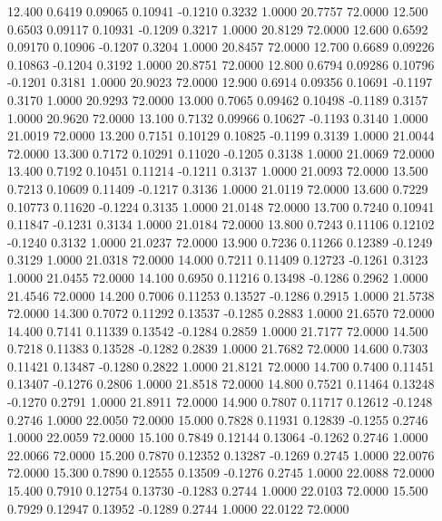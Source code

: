   12.400   0.6419   0.09065   0.10941  -0.1210   0.3232   1.0000  20.7757  72.0000
  12.500   0.6503   0.09117   0.10931  -0.1209   0.3217   1.0000  20.8129  72.0000
  12.600   0.6592   0.09170   0.10906  -0.1207   0.3204   1.0000  20.8457  72.0000
  12.700   0.6689   0.09226   0.10863  -0.1204   0.3192   1.0000  20.8751  72.0000
  12.800   0.6794   0.09286   0.10796  -0.1201   0.3181   1.0000  20.9023  72.0000
  12.900   0.6914   0.09356   0.10691  -0.1197   0.3170   1.0000  20.9293  72.0000
  13.000   0.7065   0.09462   0.10498  -0.1189   0.3157   1.0000  20.9620  72.0000
  13.100   0.7132   0.09966   0.10627  -0.1193   0.3140   1.0000  21.0019  72.0000
  13.200   0.7151   0.10129   0.10825  -0.1199   0.3139   1.0000  21.0044  72.0000
  13.300   0.7172   0.10291   0.11020  -0.1205   0.3138   1.0000  21.0069  72.0000
  13.400   0.7192   0.10451   0.11214  -0.1211   0.3137   1.0000  21.0093  72.0000
  13.500   0.7213   0.10609   0.11409  -0.1217   0.3136   1.0000  21.0119  72.0000
  13.600   0.7229   0.10773   0.11620  -0.1224   0.3135   1.0000  21.0148  72.0000
  13.700   0.7240   0.10941   0.11847  -0.1231   0.3134   1.0000  21.0184  72.0000
  13.800   0.7243   0.11106   0.12102  -0.1240   0.3132   1.0000  21.0237  72.0000
  13.900   0.7236   0.11266   0.12389  -0.1249   0.3129   1.0000  21.0318  72.0000
  14.000   0.7211   0.11409   0.12723  -0.1261   0.3123   1.0000  21.0455  72.0000
  14.100   0.6950   0.11216   0.13498  -0.1286   0.2962   1.0000  21.4546  72.0000
  14.200   0.7006   0.11253   0.13527  -0.1286   0.2915   1.0000  21.5738  72.0000
  14.300   0.7072   0.11292   0.13537  -0.1285   0.2883   1.0000  21.6570  72.0000
  14.400   0.7141   0.11339   0.13542  -0.1284   0.2859   1.0000  21.7177  72.0000
  14.500   0.7218   0.11383   0.13528  -0.1282   0.2839   1.0000  21.7682  72.0000
  14.600   0.7303   0.11421   0.13487  -0.1280   0.2822   1.0000  21.8121  72.0000
  14.700   0.7400   0.11451   0.13407  -0.1276   0.2806   1.0000  21.8518  72.0000
  14.800   0.7521   0.11464   0.13248  -0.1270   0.2791   1.0000  21.8911  72.0000
  14.900   0.7807   0.11717   0.12612  -0.1248   0.2746   1.0000  22.0050  72.0000
  15.000   0.7828   0.11931   0.12839  -0.1255   0.2746   1.0000  22.0059  72.0000
  15.100   0.7849   0.12144   0.13064  -0.1262   0.2746   1.0000  22.0066  72.0000
  15.200   0.7870   0.12352   0.13287  -0.1269   0.2745   1.0000  22.0076  72.0000
  15.300   0.7890   0.12555   0.13509  -0.1276   0.2745   1.0000  22.0088  72.0000
  15.400   0.7910   0.12754   0.13730  -0.1283   0.2744   1.0000  22.0103  72.0000
  15.500   0.7929   0.12947   0.13952  -0.1289   0.2744   1.0000  22.0122  72.0000
